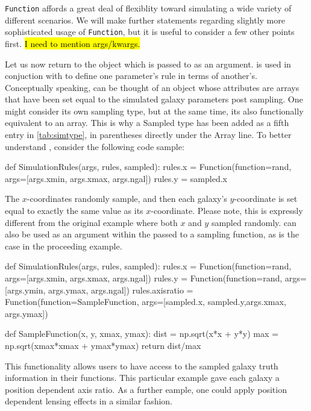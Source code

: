 \documentclass[12pt]{book}
\newcommand{\codett}[1]{\lstinline{#1}}
\begin{document}
\noindent \codett{Function} affords a great deal of flexiblity toward
simulating a wide variety of different scenarios.
We will make further statements regarding slightly more sophisticated usage
of \codett{Function}, but it is useful to consider a few other points first.
\hl{I need to mention args/kwargs.}

Let us now return to the \simsamp{} object which is passed to \simfunc{} as an argument.
\simsamp{} is used in conjuction with \simrules{} to define one parameter's rule in terms of another's.
Conceptually speaking, \simsamp{} can be thought of an object whose attributes are arrays that 
have been set equal to the simulated galaxy parameters post sampling.
One might consider \simsamp{} its own sampling type, but at the same time, its also functionally equivalent to an array.
This is why a Sampled type has been added as a fifth entry in \autoref{tab:simtype}, in parentheses directly under the Array line.
To better understand \simsamp{}, consider the following code sample:

\begin{code}
def SimulationRules(args, rules, sampled):
    rules.x = Function(function=rand, args=[args.xmin, args.xmax, args.ngal])
    rules.y = sampled.x
\end{code}

\noindent The $x$-coordinates randomly sample, and then each galaxy's $y$-coordinate
is set equal to exactly the same value as its $x$-coordinate.
Please note, this is expressly different from the original example where both $x$ and $y$ sampled randomly.
\simsamp{} can also be used as an argument within the \simargs{} passed to a sampling function,
as is the case in the proceeding example.

\begin{code}
def SimulationRules(args, rules, sampled):
    rules.x = Function(function=rand, args=[args.xmin, args.xmax, args.ngal])
    rules.y = Function(function=rand, args=[args.ymin, args.ymax, args.ngal])
    rules.axisratio = Function(function=SampleFunction, args=[sampled.x, sampled.y,args.xmax, args.ymax])

def SampleFunction(x, y, xmax, ymax):
    dist = np.sqrt(x*x + y*y)
    max = np.sqrt(xmax*xmax + ymax*ymax)
    return dist/max
\end{code}

\noindent This functionality allows users to have access to the sampled galaxy truth
information in their functions.
This particular example gave each galaxy a position dependent axis ratio.
As a further eample, one could apply position dependent lensing effects in a similar fashion.
\end{document}
